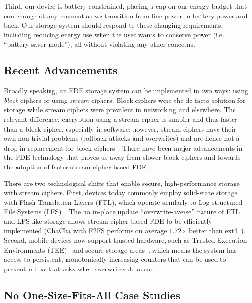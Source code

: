 Third, our device is battery constrained, placing a cap on our energy budget
that can change at any moment as we transition from line power to battery power
and back. Our storage system should respond to these changing requirements,
including reducing energy use when the user wants to conserve power (i.e.
``battery saver mode''), all without violating any other concerns.


\subsection{Recent Advancements}

Broadly speaking, an FDE storage system can be implemented in two ways: using
{\em block} ciphers or using {\em stream} ciphers. Block ciphers were the de
facto solution for storage while stream ciphers were prevalent in networking and
elsewhere. The relevant difference: encryption using a stream cipher is simpler
and thus faster than a block cipher, especially in software; however, stream
ciphers have their own non-trivial problems (\ie rollback attacks and
overwrites) and are hence not a drop-in replacement for block
ciphers~\cite{StrongBox}. There have been major advancements in the FDE
technology that moves us away from slower block ciphers and towards the adoption
of faster stream cipher based FDE~\cite{Adiantum, StrongBox}.

There are two technological shifts that enable secure, high-performance storage
with stream ciphers. First, devices today commonly employ solid-state storage
with Flash Translation Layers (FTL), which operate similarly to Log-structured
File Systems (LFS)~\cite{LFS, F2FS, NILFS}. The no in-place update
``overwrite-averse'' nature of FTL and LFS-like storage allows stream cipher
based FDE to be efficiently implemented (\eg ChaCha with F2FS performs on
average $1.72$× better than ext4~\cite{StrongBox}). Second, mobile devices now
support trusted hardware, such as Trusted Execution Environments
(TEE)~\cite{TrustZone, TEE} and secure storage areas~\cite{eMMC-standard}, which
means the system has access to persistent, monotonically increasing counters
that can be used to prevent rollback attacks when overwrites do occur.


\subsection{No One-Size-Fits-All Case Studies}

